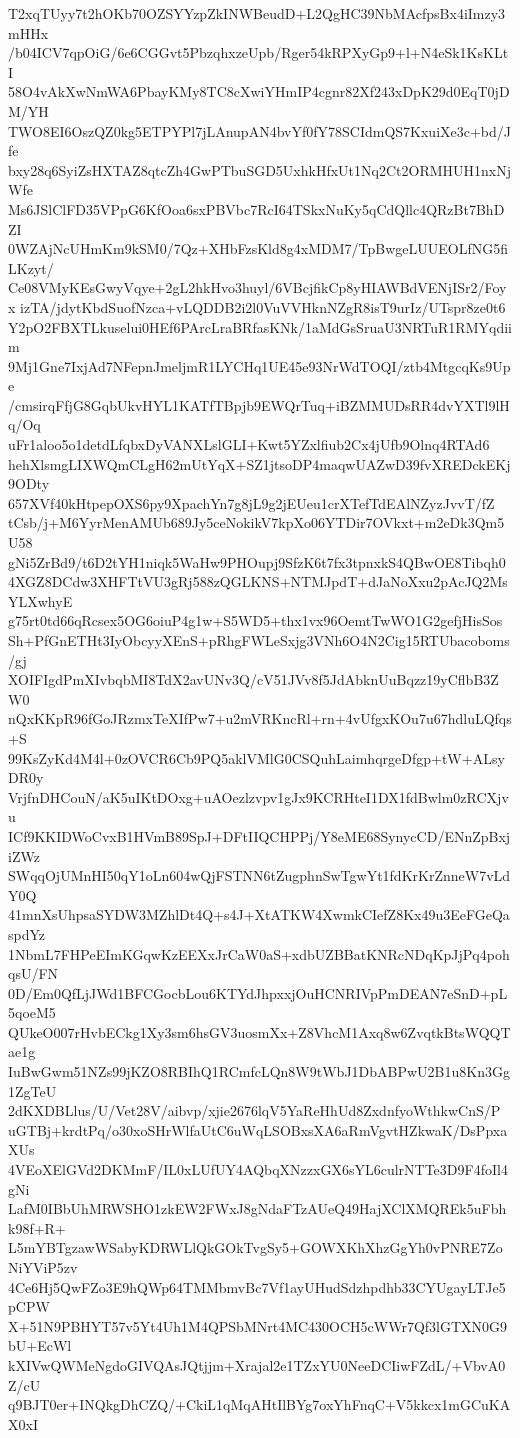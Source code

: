 T2xqTUyy7t2hOKb70OZSYYzpZkINWBeudD+L2QgHC39NbMAcfpsBx4iImzy3mHHx
/b04ICV7qpOiG/6e6CGGvt5PbzqhxzeUpb/Rger54kRPXyGp9+l+N4eSk1KsKLtI
58O4vAkXwNmWA6PbayKMy8TC8cXwiYHmIP4cgnr82Xf243xDpK29d0EqT0jDM/YH
TWO8EI6OszQZ0kg5ETPYPl7jLAnupAN4bvYf0fY78SCIdmQS7KxuiXe3c+bd/Jfe
bxy28q6SyiZsHXTAZ8qtcZh4GwPTbuSGD5UxhkHfxUt1Nq2Ct2ORMHUH1nxNjWfe
Ms6JSlClFD35VPpG6KfOoa6sxPBVbc7RcI64TSkxNuKy5qCdQllc4QRzBt7BhDZI
0WZAjNcUHmKm9kSM0/7Qz+XHbFzsKld8g4xMDM7/TpBwgeLUUEOLfNG5fiLKzyt/
Ce08VMyKEsGwyVqye+2gL2hkHvo3huyl/6VBcjfikCp8yHIAWBdVENjISr2/Foyx
izTA/jdytKbdSuofNzca+vLQDDB2i2l0VuVVHknNZgR8isT9urIz/UTspr8ze0t6
Y2pO2FBXTLkuselui0HEf6PArcLraBRfasKNk/1aMdGsSruaU3NRTuR1RMYqdiim
9Mj1Gne7IxjAd7NFepnJmeljmR1LYCHq1UE45e93NrWdTOQI/ztb4MtgcqKs9Upe
/cmsirqFfjG8GqbUkvHYL1KATfTBpjb9EWQrTuq+iBZMMUDsRR4dvYXTl9lHq/Oq
uFr1aloo5o1detdLfqbxDyVANXLslGLI+Kwt5YZxlfiub2Cx4jUfb9Olnq4RTAd6
hehXlsmgLIXWQmCLgH62mUtYqX+SZ1jtsoDP4maqwUAZwD39fvXREDckEKj9ODty
657XVf40kHtpepOXS6py9XpachYn7g8jL9g2jEUeu1crXTefTdEAlNZyzJvvT/fZ
tCsb/j+M6YyrMenAMUb689Jy5ceNokikV7kpXo06YTDir7OVkxt+m2eDk3Qm5U58
gNi5ZrBd9/t6D2tYH1niqk5WaHw9PHOupj9SfzK6t7fx3tpnxkS4QBwOE8Tibqh0
4XGZ8DCdw3XHFTtVU3gRj588zQGLKNS+NTMJpdT+dJaNoXxu2pAcJQ2MsYLXwhyE
g75rt0td66qRcsex5OG6oiuP4g1w+S5WD5+thx1vx96OemtTwWO1G2gefjHisSos
Sh+PfGnETHt3IyObcyyXEnS+pRhgFWLeSxjg3VNh6O4N2Cig15RTUbacoboms/gj
XOIFIgdPmXIvbqbMI8TdX2avUNv3Q/cV51JVv8f5JdAbknUuBqzz19yCflbB3ZW0
nQxKKpR96fGoJRzmxTeXIfPw7+u2mVRKncRl+rn+4vUfgxKOu7u67hdluLQfqs+S
99KsZyKd4M4l+0zOVCR6Cb9PQ5aklVMlG0CSQuhLaimhqrgeDfgp+tW+ALsyDR0y
VrjfnDHCouN/aK5uIKtDOxg+uAOezlzvpv1gJx9KCRHteI1DX1fdBwlm0zRCXjvu
ICf9KKIDWoCvxB1HVmB89SpJ+DFtIIQCHPPj/Y8eME68SynycCD/ENnZpBxjiZWz
SWqqOjUMnHI50qY1oLn604wQjFSTNN6tZugphnSwTgwYt1fdKrKrZnneW7vLdY0Q
41mnXsUhpsaSYDW3MZhlDt4Q+s4J+XtATKW4XwmkCIefZ8Kx49u3EeFGeQaspdYz
1NbmL7FHPeEImKGqwKzEEXxJrCaW0aS+xdbUZBBatKNRcNDqKpJjPq4pohqsU/FN
0D/Em0QfLjJWd1BFCGocbLou6KTYdJhpxxjOuHCNRIVpPmDEAN7eSnD+pL5qoeM5
QUkeO007rHvbECkg1Xy3sm6hsGV3uosmXx+Z8VhcM1Axq8w6ZvqtkBtsWQQTae1g
IuBwGwm51NZs99jKZO8RBIhQ1RCmfcLQn8W9tWbJ1DbABPwU2B1u8Kn3Gg1ZgTeU
2dKXDBLlus/U/Vet28V/aibvp/xjie2676lqV5YaReHhUd8ZxdnfyoWthkwCnS/P
uGTBj+krdtPq/o30xoSHrWlfaUtC6uWqLSOBxsXA6aRmVgvtHZkwaK/DsPpxaXUs
4VEoXElGVd2DKMmF/IL0xLUfUY4AQbqXNzzxGX6sYL6culrNTTe3D9F4foIl4gNi
LafM0IBbUhMRWSHO1zkEW2FWxJ8gNdaFTzAUeQ49HajXClXMQREk5uFbhk98f+R+
L5mYBTgzawWSabyKDRWLlQkGOkTvgSy5+GOWXKhXhzGgYh0vPNRE7ZoNiYViP5zv
4Ce6Hj5QwFZo3E9hQWp64TMMbmvBc7Vf1ayUHudSdzhpdhb33CYUgayLTJe5pCPW
X+51N9PBHYT57v5Yt4Uh1M4QPSbMNrt4MC430OCH5cWWr7Qf3lGTXN0G9bU+EcWl
kXIVwQWMeNgdoGIVQAsJQtjjm+Xrajal2e1TZxYU0NeeDCIiwFZdL/+VbvA0Z/cU
q9BJT0er+INQkgDhCZQ/+CkiL1qMqAHtIlBYg7oxYhFnqC+V5kkcx1mGCuKAX0xI
